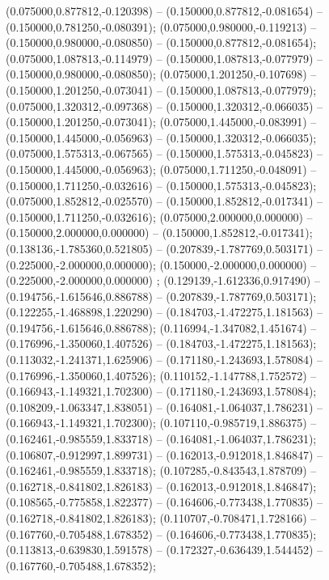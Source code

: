  (0.075000,0.877812,-0.120398) -- (0.150000,0.877812,-0.081654) -- (0.150000,0.781250,-0.080391);
 (0.075000,0.980000,-0.119213) -- (0.150000,0.980000,-0.080850) -- (0.150000,0.877812,-0.081654);
 (0.075000,1.087813,-0.114979) -- (0.150000,1.087813,-0.077979) -- (0.150000,0.980000,-0.080850);
 (0.075000,1.201250,-0.107698) -- (0.150000,1.201250,-0.073041) -- (0.150000,1.087813,-0.077979);
 (0.075000,1.320312,-0.097368) -- (0.150000,1.320312,-0.066035) -- (0.150000,1.201250,-0.073041);
 (0.075000,1.445000,-0.083991) -- (0.150000,1.445000,-0.056963) -- (0.150000,1.320312,-0.066035);
 (0.075000,1.575313,-0.067565) -- (0.150000,1.575313,-0.045823) -- (0.150000,1.445000,-0.056963);
 (0.075000,1.711250,-0.048091) -- (0.150000,1.711250,-0.032616) -- (0.150000,1.575313,-0.045823);
 (0.075000,1.852812,-0.025570) -- (0.150000,1.852812,-0.017341) -- (0.150000,1.711250,-0.032616);
 (0.075000,2.000000,0.000000) -- (0.150000,2.000000,0.000000) -- (0.150000,1.852812,-0.017341);
 (0.138136,-1.785360,0.521805) -- (0.207839,-1.787769,0.503171) -- (0.225000,-2.000000,0.000000);
 (0.150000,-2.000000,0.000000) -- (0.225000,-2.000000,0.000000) ;
 (0.129139,-1.612336,0.917490) -- (0.194756,-1.615646,0.886788) -- (0.207839,-1.787769,0.503171);
 (0.122255,-1.468898,1.220290) -- (0.184703,-1.472275,1.181563) -- (0.194756,-1.615646,0.886788);
 (0.116994,-1.347082,1.451674) -- (0.176996,-1.350060,1.407526) -- (0.184703,-1.472275,1.181563);
 (0.113032,-1.241371,1.625906) -- (0.171180,-1.243693,1.578084) -- (0.176996,-1.350060,1.407526);
 (0.110152,-1.147788,1.752572) -- (0.166943,-1.149321,1.702300) -- (0.171180,-1.243693,1.578084);
 (0.108209,-1.063347,1.838051) -- (0.164081,-1.064037,1.786231) -- (0.166943,-1.149321,1.702300);
 (0.107110,-0.985719,1.886375) -- (0.162461,-0.985559,1.833718) -- (0.164081,-1.064037,1.786231);
 (0.106807,-0.912997,1.899731) -- (0.162013,-0.912018,1.846847) -- (0.162461,-0.985559,1.833718);
 (0.107285,-0.843543,1.878709) -- (0.162718,-0.841802,1.826183) -- (0.162013,-0.912018,1.846847);
 (0.108565,-0.775858,1.822377) -- (0.164606,-0.773438,1.770835) -- (0.162718,-0.841802,1.826183);
 (0.110707,-0.708471,1.728166) -- (0.167760,-0.705488,1.678352) -- (0.164606,-0.773438,1.770835);
 (0.113813,-0.639830,1.591578) -- (0.172327,-0.636439,1.544452) -- (0.167760,-0.705488,1.678352);
